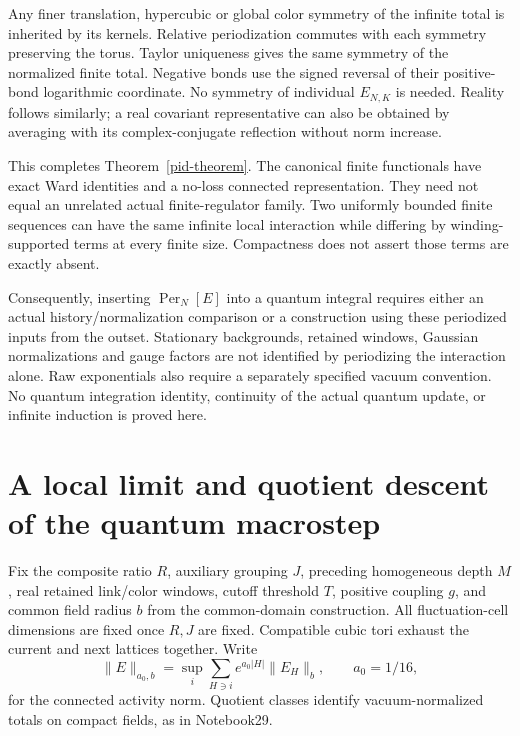 \documentclass[11pt]{article}
\theoremstyle{remark}
\begin{document}
Any finer translation, hypercubic or global color symmetry of
the infinite total is inherited by its kernels. Relative
periodization commutes with each symmetry preserving the torus.
Taylor uniqueness gives the same symmetry of the normalized
finite total. Negative bonds use the signed reversal of their
positive-bond logarithmic coordinate. No symmetry of individual
$E_{N,K}$ is needed. Reality follows similarly; a real covariant
representative can also be obtained by averaging with its
complex-conjugate reflection without norm increase.

This completes Theorem~\ref{pid-theorem}. The canonical finite
functionals have exact Ward identities and a no-loss connected
representation. They need not equal an unrelated actual
finite-regulator family. Two uniformly bounded finite sequences
can have the same infinite local interaction while differing
by winding-supported terms at every finite size. Compactness
does not assert those terms are exactly absent.

Consequently, inserting $\operatorname{Per}_N[E]$ into a quantum
integral requires either an actual history/normalization comparison
or a construction using these periodized inputs from the outset.
Stationary backgrounds, retained windows, Gaussian normalizations
and gauge factors are not identified by periodizing the interaction
alone. Raw exponentials also require a separately specified vacuum
convention. No quantum integration identity, continuity of the
actual quantum update, or infinite induction is proved here.


\section{A local limit and quotient descent of the quantum macrostep}
\label{qll-section}

Fix the composite ratio \(R\), auxiliary grouping \(J\), preceding
homogeneous depth \(M\), real retained link/color windows, cutoff
threshold \(T\), positive coupling \(g\), and common field radius
\(b\) from the common-domain construction. All fluctuation-cell
dimensions are fixed once \(R,J\) are fixed. Compatible cubic
tori exhaust the current and next lattices together. Write
\[
 \|E\|_{a_0,b}
   =\sup_i\sum_{H\ni i}e^{a_0|H|}\|E_H\|_b,
 \qquad a_0=1/16,
\]
for the connected activity norm. Quotient classes identify
vacuum-normalized totals on compact fields, as in Notebook29.
\end{document}
